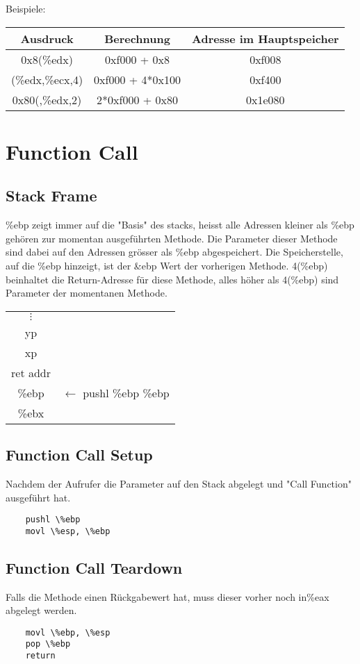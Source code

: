 \documentclass[a4paper, 11pt]{article}
\begin{document}
Beispiele:
\begin{tabular}{|c|c|c|}
	\hline
	Ausdruck & Berechnung & Adresse im Hauptspeicher \\\hline\hline
	0x8(\%edx) & 0xf000 + 0x8 & 0xf008 \\\hline
	(\%edx,\%ecx,4)&0xf000 + 4*0x100&0xf400\\\hline
	0x80(,\%edx,2)&2*0xf000 + 0x80 & 0x1e080\\\hline
\end{tabular}

\section{Function Call}
\subsection{Stack Frame}
\%ebp zeigt immer auf die "Basis" des stacks, heisst alle Adressen kleiner als \%ebp gehören zur momentan ausgeführten Methode. Die Parameter dieser Methode sind dabei auf den Adressen grösser als \%ebp abgespeichert. Die Speicherstelle, auf die \%ebp hinzeigt, ist der \&ebp Wert der vorherigen Methode. 4(\%ebp) beinhaltet die Return-Adresse für diese Methode, alles höher als 4(\%ebp) sind Parameter der momentanen Methode.
\begin{tabular}{|c|c}
	$\vdots$&\\\cline{0-0}
	yp\\\cline{0-0}
	xp\\\cline{0-0}
	ret addr\\\cline{0-0}
	\%ebp & $\leftarrow$ pushl \%ebp 			\%ebp\\\cline{0-0}
 	\%ebx\\\cline{0-0}
\end{tabular}

\subsection{Function Call Setup}
Nachdem der Aufrufer die Parameter auf den Stack abgelegt und "Call Function" ausgeführt hat.
\begin{lstlisting}
	pushl \%ebp
	movl \%esp, \%ebp
\end{lstlisting}

 
\subsection{Function Call Teardown}
Falls die Methode einen Rückgabewert hat, muss dieser vorher noch in\%eax abgelegt werden.
\begin{lstlisting}
	movl \%ebp, \%esp
	pop \%ebp
	return
\end{lstlisting}
\end{document}
